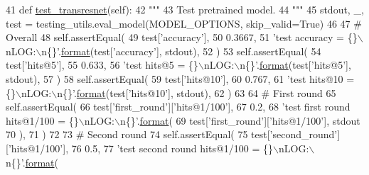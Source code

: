 \begin{DoxyCode}
41     \textcolor{keyword}{def }\hyperlink{namespacetest__transresnet}{test\_transresnet}(self):
42         \textcolor{stringliteral}{"""}
43 \textcolor{stringliteral}{        Test pretrained model.}
44 \textcolor{stringliteral}{        """}
45         stdout, \_, test = testing\_utils.eval\_model(MODEL\_OPTIONS, skip\_valid=\textcolor{keyword}{True})
46 
47         \textcolor{comment}{# Overall}
48         self.assertEqual(
49             test[\textcolor{stringliteral}{'accuracy'}],
50             0.3667,
51             \textcolor{stringliteral}{'test accuracy = \{\}\(\backslash\)nLOG:\(\backslash\)n\{\}'}.\hyperlink{namespaceparlai_1_1chat__service_1_1services_1_1messenger_1_1shared__utils_a32e2e2022b824fbaf80c747160b52a76}{format}(test[\textcolor{stringliteral}{'accuracy'}], stdout),
52         )
53         self.assertEqual(
54             test[\textcolor{stringliteral}{'hits@5'}],
55             0.633,
56             \textcolor{stringliteral}{'test hits@5 = \{\}\(\backslash\)nLOG:\(\backslash\)n\{\}'}.\hyperlink{namespaceparlai_1_1chat__service_1_1services_1_1messenger_1_1shared__utils_a32e2e2022b824fbaf80c747160b52a76}{format}(test[\textcolor{stringliteral}{'hits@5'}], stdout),
57         )
58         self.assertEqual(
59             test[\textcolor{stringliteral}{'hits@10'}],
60             0.767,
61             \textcolor{stringliteral}{'test hits@10 = \{\}\(\backslash\)nLOG:\(\backslash\)n\{\}'}.\hyperlink{namespaceparlai_1_1chat__service_1_1services_1_1messenger_1_1shared__utils_a32e2e2022b824fbaf80c747160b52a76}{format}(test[\textcolor{stringliteral}{'hits@10'}], stdout),
62         )
63 
64         \textcolor{comment}{# First round}
65         self.assertEqual(
66             test[\textcolor{stringliteral}{'first\_round'}][\textcolor{stringliteral}{'hits@1/100'}],
67             0.2,
68             \textcolor{stringliteral}{'test first round hits@1/100 = \{\}\(\backslash\)nLOG:\(\backslash\)n\{\}'}.\hyperlink{namespaceparlai_1_1chat__service_1_1services_1_1messenger_1_1shared__utils_a32e2e2022b824fbaf80c747160b52a76}{format}(
69                 test[\textcolor{stringliteral}{'first\_round'}][\textcolor{stringliteral}{'hits@1/100'}], stdout
70             ),
71         )
72 
73         \textcolor{comment}{# Second round}
74         self.assertEqual(
75             test[\textcolor{stringliteral}{'second\_round'}][\textcolor{stringliteral}{'hits@1/100'}],
76             0.5,
77             \textcolor{stringliteral}{'test second round hits@1/100 = \{\}\(\backslash\)nLOG:\(\backslash\)n\{\}'}.\hyperlink{namespaceparlai_1_1chat__service_1_1services_1_1messenger_1_1shared__utils_a32e2e2022b824fbaf80c747160b52a76}{format}(

\end{DoxyCode}

